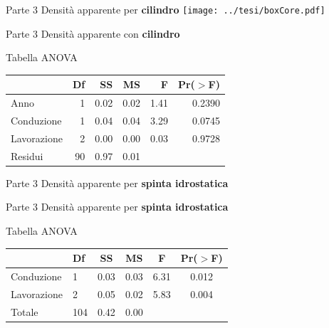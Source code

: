 \documentclass[xcolor={usenames, table, x11names}, final, 10pt]{beamer}
\begin{document}
\begin{frame}[label=Core]{Parte 3 \small{Densità apparente per \bf{\large{cilindro}}}}
  \hyperlink{finale}{}  
  \centering
  \texttt{[image: ../tesi/boxCore.pdf]}
  
\end{frame}

\begin{frame}{Parte 3 \small{Densità apparente con  \bf{\large{cilindro}}}}

  Tabella ANOVA

  \begin{table}[ht]
    \centering
    \label{tab:anova del modello}
    \begin{tabular}{lrrrrr}
      \toprule
      & Df & SS & MS & F  & Pr($>$F) \\ 
      \midrule 
      Anno         & 1  &  0.02  &  0.02  &   1.41   & 0.2390   \\ 
      Conduzione   & 1  &  0.04  &  0.04  &   3.29   & 0.0745   \\ 
      Lavorazione  & 2  &  0.00  &  0.00  &   0.03   & 0.9728   \\ 
      Residui      & 90 &  0.97  &  0.01  &          &          \\ 
      \bottomrule
    \end{tabular}
  \end{table}
\end{frame}

\begin{frame}[label=Clod]{Parte 3 \small{Densità apparente per \bf{\large{spinta idrostatica}}}}
  \hyperlink{finale}{}
\end{frame}

\begin{frame}{Parte 3 \small{Densità apparente per \bf{\large{spinta idrostatica}}}}

  Tabella ANOVA

  
  \begin{table}
    \centering
    \begin{tabular}{llcccc}
      \toprule
      & Df  & SS & MS & F & Pr($>$F) \\ 
      \midrule
      Conduzione  & 1   & 0.03   & 0.03    & 6.31    & 0.012    \\ 
      Lavorazione & 2   & 0.05   & 0.02    & 5.83    & 0.004    \\ 
      Totale      & 104 & 0.42   & 0.00    &         &          \\ 
      \bottomrule
    \end{tabular}
    \label{tab:Anova densita per spinta}
  \end{table}

\end{frame}
\end{document}
